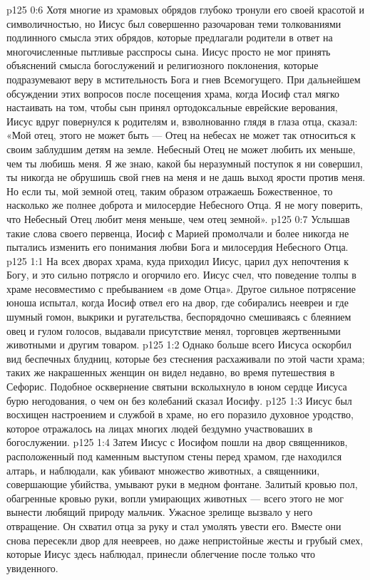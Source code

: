 \vs p125 0:6 Хотя многие из храмовых обрядов глубоко тронули его своей красотой и символичностью, но Иисус был совершенно разочарован теми толкованиями подлинного смысла этих обрядов, которые предлагали родители в ответ на многочисленные пытливые расспросы сына. Иисус просто не мог принять объяснений смысла богослужений и религиозного поклонения, которые подразумевают веру в мстительность Бога и гнев Всемогущего. При дальнейшем обсуждении этих вопросов после посещения храма, когда Иосиф стал мягко настаивать на том, чтобы сын принял ортодоксальные еврейские верования, Иисус вдруг повернулся к родителям и, взволнованно глядя в глаза отца, сказал: «Мой отец, этого не может быть --- Отец на небесах не может так относиться к своим заблудшим детям на земле. Небесный Отец не может любить их меньше, чем ты любишь меня. Я же знаю, какой бы неразумный поступок я ни совершил, ты никогда не обрушишь свой гнев на меня и не дашь выход ярости против меня. Но если ты, мой земной отец, таким образом отражаешь Божественное, то насколько же полнее доброта и милосердие Небесного Отца. Я не могу поверить, что Небесный Отец любит меня меньше, чем отец земной».
\vs p125 0:7 Услышав такие слова своего первенца, Иосиф с Марией промолчали и более никогда не пытались изменить его понимания любви Бога и милосердия Небесного Отца.
\vs p125 1:1 На всех дворах храма, куда приходил Иисус, царил дух непочтения к Богу, и это сильно потрясло и огорчило его. Иисус счел, что поведение толпы в храме несовместимо с пребыванием «в доме Отца». Другое сильное потрясение юноша испытал, когда Иосиф отвел его на двор, где собирались неевреи и где шумный гомон, выкрики и ругательства, беспорядочно смешиваясь с блеянием овец и гулом голосов, выдавали присутствие менял, торговцев жертвенными животными и другим товаром.
\vs p125 1:2 Однако больше всего Иисуса оскорбил вид беспечных блудниц, которые без стеснения расхаживали по этой части храма; таких же накрашенных женщин он видел недавно, во время путешествия в Сефорис. Подобное осквернение святыни всколыхнуло в юном сердце Иисуса бурю негодования, о чем он без колебаний сказал Иосифу.
\vs p125 1:3 Иисус был восхищен настроением и службой в храме, но его поразило духовное уродство, которое отражалось на лицах многих людей бездумно участвоваших в богослужении.
\vs p125 1:4 Затем Иисус с Иосифом пошли на двор священников, расположенный под каменным выступом стены перед храмом, где находился алтарь, и наблюдали, как убивают множество животных, а священники, совершающие убийства, умывают руки в медном фонтане. Залитый кровью пол, обагренные кровью руки, вопли умирающих животных --- всего этого не мог вынести любящий природу мальчик. Ужасное зрелище вызвало у него отвращение. Он схватил отца за руку и стал умолять увести его. Вместе они снова пересекли двор для неевреев, но даже непристойные жесты и грубый смех, которые Иисус здесь наблюдал, принесли облегчение после только что увиденного.

